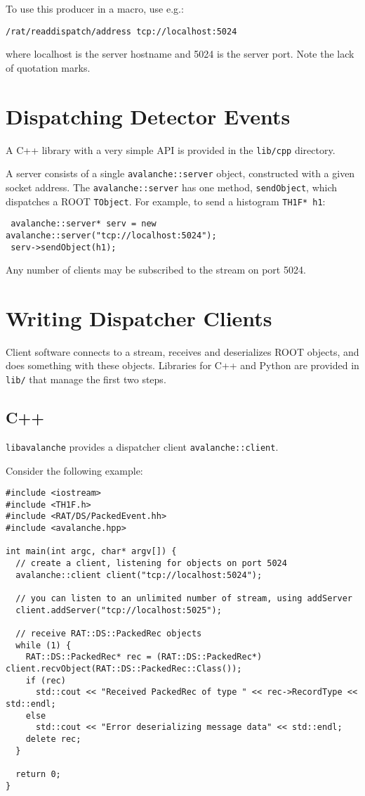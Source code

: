 \documentclass{article}
\begin{document}
To use this producer in a macro, use e.g.:
\begin{verbatim}
/rat/readdispatch/address tcp://localhost:5024
\end{verbatim}
where localhost is the server hostname and 5024 is the server port. Note the lack of quotation marks.

\section{Dispatching Detector Events}
A C++ library with a very simple API is provided in the {\tt lib/cpp} directory.

A server consists of a single {\tt avalanche::server} object, constructed with a given socket address. The {\tt avalanche::server} has one method, {\tt sendObject}, which dispatches a ROOT {\tt TObject}. For example, to send a histogram {\tt TH1F* h1}:

\begin{verbatim}
 avalanche::server* serv = new avalanche::server("tcp://localhost:5024");
 serv->sendObject(h1);
\end{verbatim}
Any number of clients may be subscribed to the stream on port 5024.

\section{Writing Dispatcher Clients}
Client software connects to a stream, receives and deserializes ROOT objects, and does something with these objects. Libraries for C++ and Python are provided in {\tt lib/} that manage the first two steps.

\subsection{C++}
{\tt libavalanche} provides a dispatcher client {\tt avalanche::client}.

Consider the following example:

\begin{verbatim}
#include <iostream>
#include <TH1F.h>
#include <RAT/DS/PackedEvent.hh>
#include <avalanche.hpp>

int main(int argc, char* argv[]) {
  // create a client, listening for objects on port 5024
  avalanche::client client("tcp://localhost:5024");

  // you can listen to an unlimited number of stream, using addServer
  client.addServer("tcp://localhost:5025");

  // receive RAT::DS::PackedRec objects
  while (1) {
    RAT::DS::PackedRec* rec = (RAT::DS::PackedRec*) client.recvObject(RAT::DS::PackedRec::Class());
    if (rec)
      std::cout << "Received PackedRec of type " << rec->RecordType << std::endl;
    else
      std::cout << "Error deserializing message data" << std::endl;
    delete rec;
  }

  return 0;
}
\end{verbatim}
\end{document}
